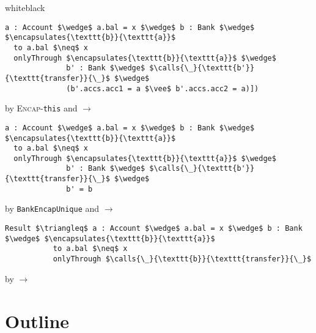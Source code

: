 \documentclass[acmsmall,review,anonymous]{acmart}\settopmatter{printfolios=true,printccs=false,printacmref=false}
\begin{document}
\begin{proofBox}{white}{black}
\begin{minipage}{0.75\textwidth}
\begin{lstlisting}[language = Chainmail, mathescape=true]
a : Account $\wedge$ a.bal = x $\wedge$ b : Bank $\wedge$ $\encapsulates{\texttt{b}}{\texttt{a}}$
  to a.bal $\neq$ x
  onlyThrough $\encapsulates{\texttt{b}}{\texttt{a}}$ $\wedge$
              b' : Bank $\wedge$ $\calls{\_}{\texttt{b'}}{\texttt{transfer}}{\_}$ $\wedge$ 
              (b'.accs.acc1 = a $\vee$ b'.accs.acc2 = a)])
\end{lstlisting}
\end{minipage}
\begin{minipage}{0.24\textwidth}
\scriptsize
\hfill by \textsc{Encap-}\texttt{this} and $\longrightarrow$
\end{minipage}
\begin{minipage}{0.75\textwidth}
\begin{lstlisting}[language = Chainmail, mathescape=true]
a : Account $\wedge$ a.bal = x $\wedge$ b : Bank $\wedge$ $\encapsulates{\texttt{b}}{\texttt{a}}$
  to a.bal $\neq$ x
  onlyThrough $\encapsulates{\texttt{b}}{\texttt{a}}$ $\wedge$
              b' : Bank $\wedge$ $\calls{\_}{\texttt{b'}}{\texttt{transfer}}{\_}$ $\wedge$ 
              b' = b
\end{lstlisting}
\end{minipage}
\begin{minipage}{0.24\textwidth}
\scriptsize
\hfill by \texttt{BankEncapUnique} and $\longrightarrow$
\end{minipage}
\begin{minipage}{0.75\textwidth}
\begin{lstlisting}[language = Chainmail, mathescape=true]
Result $\triangleq$ a : Account $\wedge$ a.bal = x $\wedge$ b : Bank $\wedge$ $\encapsulates{\texttt{b}}{\texttt{a}}$
           to a.bal $\neq$ x
           onlyThrough $\calls{\_}{\texttt{b}}{\texttt{transfer}}{\_}$
\end{lstlisting}
\end{minipage}
\begin{minipage}{0.24\textwidth}
\scriptsize
\hfill by $\longrightarrow$
\end{minipage}
\end{proofBox}











\section{Outline}
\end{document}
